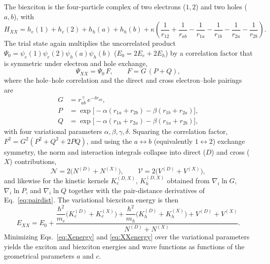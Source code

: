 The biexciton is the four-particle complex of two electrons ($1,2$) and two
holes ($a,b$), with
\begin{equation}
  H_{XX}=h_e(1)+h_e(2)+h_h(a)+h_h(b)
  +\kappa\!\left(\frac{1}{r_{12}}+\frac{1}{r_{ab}}
  -\frac{1}{r_{1a}}-\frac{1}{r_{1b}}-\frac{1}{r_{2a}}-\frac{1}{r_{2b}}\right).
  \label{eq:Hxx}
\end{equation}
The trial state again multiplies the uncorrelated product
$\Psi_0=\psi_e(1)\psi_e(2)\psi_h(a)\psi_h(b)$ ($E_0=2E_e+2E_h$) by a correlation
factor that is symmetric under electron and hole exchange,
\begin{equation}
  \Psi_{XX}=\Psi_0\,F,\qquad F=G\,(P+Q),
  \label{eq:XXtrial}
\end{equation}
where the hole--hole correlation and the direct and cross electron--hole pairings are
\begin{align}
  G &= r_{ab}^{\,\gamma}\,e^{-\delta r_{ab}},\\
  P &= \exp\!\big[-\alpha(r_{1a}+r_{2b})-\beta(r_{1b}+r_{2a})\big],\\
  Q &= \exp\!\big[-\alpha(r_{1b}+r_{2a})-\beta(r_{1a}+r_{2b})\big],
  \label{eq:GPQ}
\end{align}
with four variational parameters $\alpha,\beta,\gamma,\delta$. Squaring the
correlation factor, $F^{2}=G^{2}(P^{2}+Q^{2}+2PQ)$, and using the
$a\!\leftrightarrow\! b$ (equivalently $1\!\leftrightarrow\! 2$) exchange symmetry,
the norm and interaction integrals collapse into direct ($D$) and cross ($X$)
contributions,
\begin{equation}
  \mathcal N=2\big(N^{(D)}+N^{(X)}\big),
  \qquad
  \mathcal V=2\big(V^{(D)}+V^{(X)}\big),
  \label{eq:DXdecomp}
\end{equation}
and likewise for the kinetic kernels $K_e^{(D,X)}$, $K_h^{(D,X)}$ obtained from
$\nabla_i\ln G$, $\nabla_i\ln P$, and $\nabla_i\ln Q$ together with the
pair-distance derivatives of Eq.~\eqref{eq:pairdist}. The variational biexciton
energy is then
\begin{equation}
  E_{XX}=E_0+
  \frac{\dfrac{\hbar^{2}}{m_e}\big(K_e^{(D)}+K_e^{(X)}\big)
        +\dfrac{\hbar^{2}}{m_h}\big(K_h^{(D)}+K_h^{(X)}\big)
        +V^{(D)}+V^{(X)}}
       {N^{(D)}+N^{(X)}} .
  \label{eq:XXenergy}
\end{equation}
Minimizing Eqs.~\eqref{eq:Xenergy} and \eqref{eq:XXenergy} over the variational
parameters yields the exciton and biexciton energies and wave functions as
functions of the geometrical parameters $a$ and $c$.

